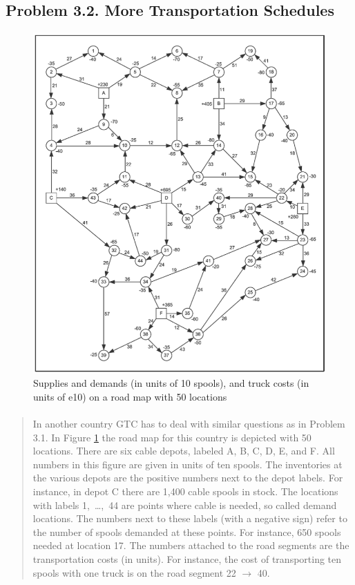 \subsection{Problem 3.2. More Transportation Schedules}

\begin{figure}[H]
	\centering
	\includegraphics[scale=1]{./img/figure3-14.png}
	\caption{Supplies and demands (in units of 10 spools), and truck costs (in units of e10) on a road map with 50 locations}
	\label{network3-2}
\end{figure}

\paragraph{}
\begin{quote}
In another country GTC has to deal with similar questions as in Problem 3.1. In Figure \ref{network3-2} the road map for this country is depicted with 50 locations. There are six cable depots, labeled A, B, C, D, E, and F. All numbers in this figure are given in units of ten spools. The inventories at the various depots are the positive numbers next to the depot labels. For instance, in depot C there are 1,400 cable spools in stock. The locations with labels 1,~\dots,~44 are points where cable is needed, so called demand locations. The numbers next to these labels (with a negative sign) refer to the number of spools demanded at these points. For instance, 650 spools needed at location 17. The numbers attached to the road segments are the transportation costs (in  units). For instance, the cost of transporting ten spools with one truck is  on the road segment 22 $\rightarrow$ 40.
\end{quote}

